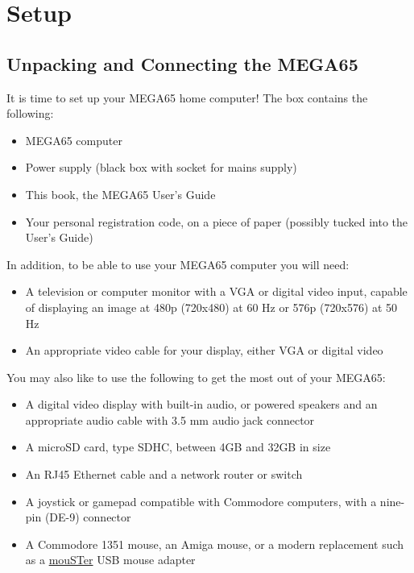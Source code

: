 \chapter{Setup}

\section{Unpacking and Connecting the MEGA65}
\label{cha:setup}

It is time to set up your MEGA65 home computer! The box contains the following:

\begin{itemize}
\setlength\itemsep{-0.75mm}
	\item MEGA65 computer
	\item Power supply (black box with socket for mains supply)
	\item This book, the MEGA65 User's Guide
	\item Your personal registration code, on a piece of paper (possibly tucked into the User's Guide)
\end{itemize}

In addition, to be able to use your MEGA65 computer you will need:

\begin{itemize}
	\item A television or computer monitor with a VGA or digital video input, capable of displaying an image at 480p (720x480) at 60 Hz or 576p (720x576) at 50 Hz
	\item An appropriate video cable for your display, either VGA or digital video
\end{itemize}

You may also like to use the following to get the most out of your MEGA65:

\begin{itemize}
	\item A digital video display with built-in audio, or powered speakers and an appropriate audio cable with 3.5 mm audio jack connector
	\item A microSD card, type SDHC, between 4GB and 32GB in size
	\item An RJ45 Ethernet cable and a network router or switch
	\item A joystick or gamepad compatible with Commodore computers, with a nine-pin (DE-9) connector
	\item A Commodore 1351 mouse, an Amiga mouse, or a modern replacement such as a \href{https://retrohax.net/shop/amiga/mouster/}{mouSTer} USB mouse adapter
\end{itemize}

